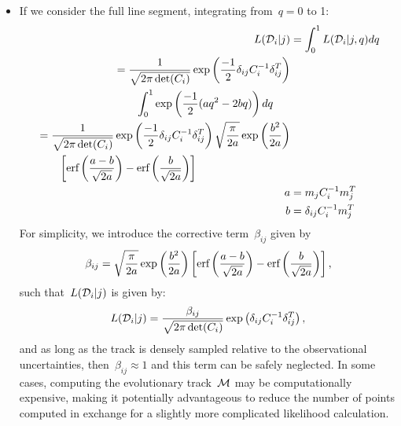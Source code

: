 \documentclass[ms.tex]{subfiles}
\begin{document}
\begin{itemize}
	\item If we consider the full line segment, integrating from~$q = 0$ to 1:
	\begin{subequations}\begin{align}
	L(\mathcal{D}_i | j) &= \int_0^1 L(\mathcal{D}_i | j, q) dq
	\\
	\begin{split}
	&= \frac{1}{\sqrt{2\pi \det(C_i)}}
	\exp\left(\frac{-1}{2}\delta_{ij}C_i^{-1}\delta_{ij}^T\right)
	\\
	&\qquad \int_0^1 \exp\left(\frac{-1}{2}(aq^2 - 2bq)\right)dq
	\end{split}
	\\
	\begin{split}
	&= \frac{1}{\sqrt{2\pi \det(C_i)}}
	\exp\left(\frac{-1}{2}\delta_{ij}C_i^{-1}\delta_{ij}^T\right)
	\sqrt{\frac{\pi}{2a}} \exp\left(\frac{b^2}{2a}\right)
	\\
	&\qquad \left[\text{erf}\left(\frac{a - b}{\sqrt{2a}}\right) -
	\text{erf}\left(\frac{b}{\sqrt{2a}}\right)\right]
	\end{split}
	\\
	a &= m_j C_i^{-1} m_j^T
	\\
	b &= \delta_{ij} C_i^{-1} m_j^T
	\end{align}\end{subequations}
	For simplicity, we introduce the corrective term~$\beta_{ij}$ given by
	\begin{equation}
	\beta_{ij} = \sqrt{\frac{\pi}{2a}}
	\exp\left(\frac{b^2}{2a}\right)
	\left[
	\text{erf}\left(\frac{a - b}{\sqrt{2a}}\right) -
	\text{erf}\left(\frac{b}{\sqrt{2a}}\right)
	\right],
	\end{equation}
	such that~$L(\mathcal{D}_i | j)$ is given by:
	\begin{equation}
	L(\mathcal{D}_i | j) = \frac{\beta_{ij}}{\sqrt{2\pi \det(C_i)}}
	\exp\left(\delta_{ij}C_i^{-1}\delta_{ij}^T\right),
	\end{equation}
	and as long as the track is densely sampled relative to the observational
	uncertainties, then~$\beta_{ij} \approx 1$ and this term can be safely
	neglected.
	In some cases, computing the evolutionary track~$\mathcal{M}$ may be
	computationally expensive, making it potentially advantageous to reduce the
	number of points computed in exchange for a slightly more complicated
	likelihood calculation.


\end{itemize}
\end{document}
